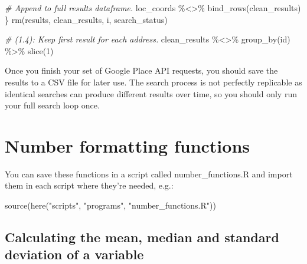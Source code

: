 \documentclass[
]{book}
\newenvironment{Shaded}{\begin{snugshade}}{\end{snugshade}}
\newcommand{\CommentTok}[1]{\textcolor[rgb]{0.56,0.35,0.01}{\textit{#1}}}
\newcommand{\DecValTok}[1]{\textcolor[rgb]{0.00,0.00,0.81}{#1}}
\newcommand{\FunctionTok}[1]{\textcolor[rgb]{0.00,0.00,0.00}{#1}}
\newcommand{\NormalTok}[1]{#1}
\newcommand{\SpecialCharTok}[1]{\textcolor[rgb]{0.00,0.00,0.00}{#1}}
\newcommand{\StringTok}[1]{\textcolor[rgb]{0.31,0.60,0.02}{#1}}
\begin{document}
\begin{Shaded}
\begin{Highlighting}[]
  \CommentTok{\# Append to full results dataframe.}
\NormalTok{  loc\_coords }\SpecialCharTok{\%\textless{}\textgreater{}\%} \FunctionTok{bind\_rows}\NormalTok{(clean\_results)}
\NormalTok{\}}
\FunctionTok{rm}\NormalTok{(results, clean\_results, i, search\_status)}

\CommentTok{\# (1.4): Keep first result for each address.}
\NormalTok{clean\_results }\SpecialCharTok{\%\textless{}\textgreater{}\%}
  \FunctionTok{group\_by}\NormalTok{(id) }\SpecialCharTok{\%\textgreater{}\%} 
  \FunctionTok{slice}\NormalTok{(}\DecValTok{1}\NormalTok{)}
\end{Highlighting}
\end{Shaded}

Once you finish your set of Google Place API requests, you should save the results to a CSV file for later use. The search process is not perfectly replicable as identical searches can produce different results over time, so you should only run your full search loop once.

\hypertarget{number-formatting-functions}{%
\section{Number formatting functions}\label{number-formatting-functions}}

You can save these functions in a script called number\_functions.R and import them in each script where they're needed, e.g.:

\begin{Shaded}
\begin{Highlighting}[]
\FunctionTok{source}\NormalTok{(}\FunctionTok{here}\NormalTok{(}\StringTok{"scripts"}\NormalTok{, }\StringTok{"programs"}\NormalTok{, }\StringTok{"number\_functions.R"}\NormalTok{))}
\end{Highlighting}
\end{Shaded}

\hypertarget{calculating-the-mean-median-and-standard-deviation-of-a-variable}{%
\subsection{Calculating the mean, median and standard deviation of a variable}\label{calculating-the-mean-median-and-standard-deviation-of-a-variable}}
\end{document}
